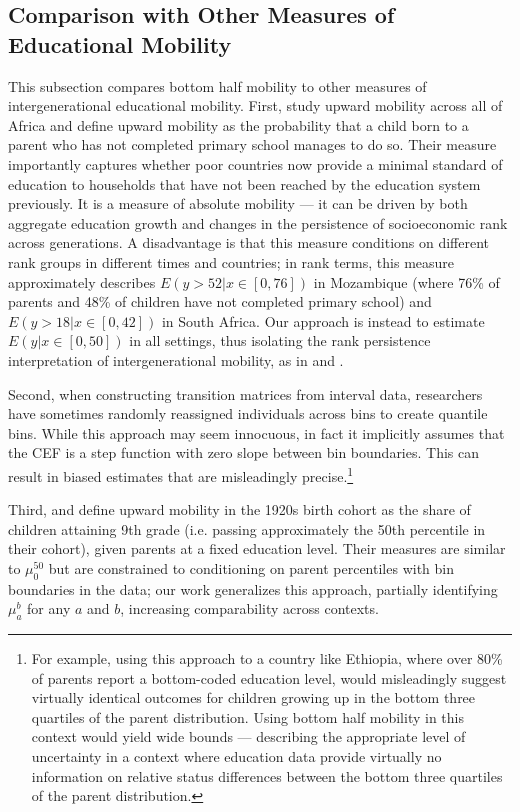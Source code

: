 \documentclass[12pt,letterpaper]{article}
\numberwithin{equation}{section}
\begin{document}
\subsection{Comparison with Other Measures of Educational Mobility}
\label{sec:comparison}

This subsection compares bottom half mobility to other measures of intergenerational educational mobility. First,  study upward mobility across all of Africa and define upward mobility as the probability that a child born to a parent who has not completed primary school manages to do so. Their measure importantly captures whether poor countries now provide a minimal standard of education to households that have not been reached by the education system previously. It is a measure of absolute mobility --- it can be driven by both aggregate education growth and changes in the persistence of socioeconomic rank across generations. A disadvantage is that this measure conditions on different rank groups in different times and countries; in rank terms, this measure approximately describes $E(y > 52|x \in [0,76])$ in Mozambique (where 76\% of parents and 48\% of children have not completed primary school) and $E(y > 18|x \in [0,42])$ in South Africa. Our approach is instead to estimate $E(y|x \in [0, 50])$ in all settings, thus isolating the rank persistence interpretation of intergenerational mobility, as in  and .

Second, when constructing transition matrices from interval data, researchers have sometimes randomly reassigned individuals across bins to create quantile bins. While this approach may seem innocuous, in fact it implicitly assumes that the CEF is a step function with zero slope between bin boundaries. This can result in biased estimates that are misleadingly precise.\footnote{For example, using this approach to a country like Ethiopia, where over 80\% of parents report a bottom-coded education level, would misleadingly suggest virtually identical outcomes for children growing up in the bottom three quartiles of the parent distribution. Using bottom half mobility in this context would yield wide bounds --- describing the appropriate level of uncertainty in a context where education data provide virtually no information on relative status differences between the bottom three quartiles of the parent distribution.}

Third,  and  define upward mobility in the 1920s birth cohort as the share of children attaining 9th grade (i.e. passing approximately the 50th percentile in their cohort), given parents at a fixed education level. Their measures are similar to $\mu_0^{50}$ but are constrained to conditioning on parent percentiles with bin boundaries in the data; our work generalizes this approach, partially identifying $\mu_a^b$ for any $a$ and $b$, increasing comparability across contexts.
\end{document}
